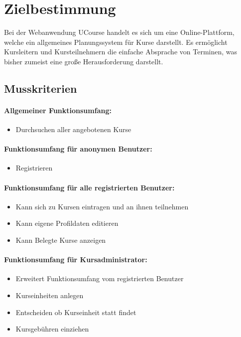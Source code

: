 \documentclass[a4paper]{scrreprt}
\begin{document}
 


\tableofcontents
 
\chapter{Zielbestimmung}
	   Bei der Webanwendung UCourse handelt es sich um eine Online-Plattform, welche ein allgemeines Planungssystem für Kurse darstellt. Es ermöglicht Kursleitern und Kursteilnehmern die einfache Absprache von Terminen, was bisher zumeist eine große Herausforderung darstellt.
    \section{Musskriterien}      
    	\subsubsection{Allgemeiner Funktionsumfang:}
      		\begin{itemize}
      		\item Durchsuchen aller angebotenen Kurse
      		\end{itemize}
     	\subsubsection{Funktionsumfang für anonymen Benutzer:}
       		\begin{itemize}
       		\item Registrieren
       		\end{itemize}
     	\subsubsection{Funktionsumfang für alle registrierten Benutzer:}
			\begin{itemize}
			\item Kann sich zu Kursen eintragen und an ihnen teilnehmen
			\item Kann eigene Profildaten editieren
			\item Kann Belegte Kurse anzeigen
			\end{itemize}
		\subsubsection{Funktionsumfang für Kursadministrator:}
			\begin{itemize}
			\item Erweitert Funktionsumfang vom \glqq registrierten Benutzer\grqq
			\item Kurseinheiten anlegen
			\item Entscheiden ob Kurseinheit statt findet
			\item Kursgebühren einziehen
			\end{itemize}
\end{document}
